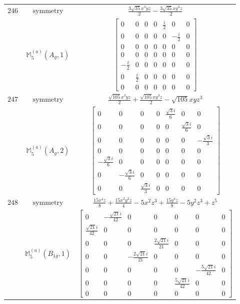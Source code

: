 \documentclass[fleqn,8pt,landscape]{jsarticle}
\begin{document}
\begin{longtable}{ccc}
$ 246 $ & $ \text{symmetry} $ & $ \frac{3 \sqrt{35} x^{3} y z}{2} - \frac{3 \sqrt{35} x y^{3} z}{2} $ \\
$  $ & $ \mathbb{M}_{5}^{(a)}(A_{g},1) $ & $ \begin{bmatrix} 0 & 0 & 0 & 0 & \frac{i}{2} & 0 & 0 \\ 0 & 0 & 0 & 0 & 0 & - \frac{i}{2} & 0 \\ 0 & 0 & 0 & 0 & 0 & 0 & 0 \\ 0 & 0 & 0 & 0 & 0 & 0 & 0 \\ - \frac{i}{2} & 0 & 0 & 0 & 0 & 0 & 0 \\ 0 & \frac{i}{2} & 0 & 0 & 0 & 0 & 0 \\ 0 & 0 & 0 & 0 & 0 & 0 & 0 \end{bmatrix} $ \\ \hline
$ 247 $ & $ \text{symmetry} $ & $ \frac{\sqrt{105} x^{3} y z}{2} + \frac{\sqrt{105} x y^{3} z}{2} - \sqrt{105} x y z^{3} $ \\
$  $ & $ \mathbb{M}_{5}^{(a)}(A_{g},2) $ & $ \begin{bmatrix} 0 & 0 & 0 & 0 & \frac{\sqrt{3} i}{6} & 0 & 0 \\ 0 & 0 & 0 & 0 & 0 & \frac{\sqrt{3} i}{6} & 0 \\ 0 & 0 & 0 & 0 & 0 & 0 & - \frac{\sqrt{3} i}{3} \\ 0 & 0 & 0 & 0 & 0 & 0 & 0 \\ - \frac{\sqrt{3} i}{6} & 0 & 0 & 0 & 0 & 0 & 0 \\ 0 & - \frac{\sqrt{3} i}{6} & 0 & 0 & 0 & 0 & 0 \\ 0 & 0 & \frac{\sqrt{3} i}{3} & 0 & 0 & 0 & 0 \end{bmatrix} $ \\ \hline
$ 248 $ & $ \text{symmetry} $ & $ \frac{15 x^{4} z}{8} + \frac{15 x^{2} y^{2} z}{4} - 5 x^{2} z^{3} + \frac{15 y^{4} z}{8} - 5 y^{2} z^{3} + z^{5} $ \\
$  $ & $ \mathbb{M}_{5}^{(a)}(B_{1g},1) $ & $ \begin{bmatrix} 0 & - \frac{\sqrt{21} i}{42} & 0 & 0 & 0 & 0 & 0 \\ \frac{\sqrt{21} i}{42} & 0 & 0 & 0 & 0 & 0 & 0 \\ 0 & 0 & 0 & \frac{2 \sqrt{21} i}{21} & 0 & 0 & 0 \\ 0 & 0 & - \frac{2 \sqrt{21} i}{21} & 0 & 0 & 0 & 0 \\ 0 & 0 & 0 & 0 & 0 & - \frac{5 \sqrt{21} i}{42} & 0 \\ 0 & 0 & 0 & 0 & \frac{5 \sqrt{21} i}{42} & 0 & 0 \\ 0 & 0 & 0 & 0 & 0 & 0 & 0 \end{bmatrix} $ \\ \hline

\end{longtable}
\end{document}
